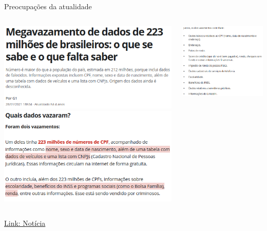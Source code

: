 \begin{frame}{Preocupações da atualidade}
    \centering
    \begin{columns}
        \begin{column}{0.48\linewidth}
            \includegraphics[width=\linewidth]{Figuras/megavazamento1.png}
            \includegraphics[width=\linewidth]{Figuras/megavazamento2.png}
        \end{column}
        \begin{column}{0.48\linewidth}
            \includegraphics[width=\linewidth]{Figuras/megavazamento3.png}
        \end{column}
    \end{columns}
    \href{https://g1.globo.com/economia/tecnologia/noticia/2021/01/28/vazamento-de-dados-de-223-milhoes-de-brasileiros-o-que-se-sabe-e-o-que-falta-saber.ghtml}{Link: Notícia}

\end{frame}
